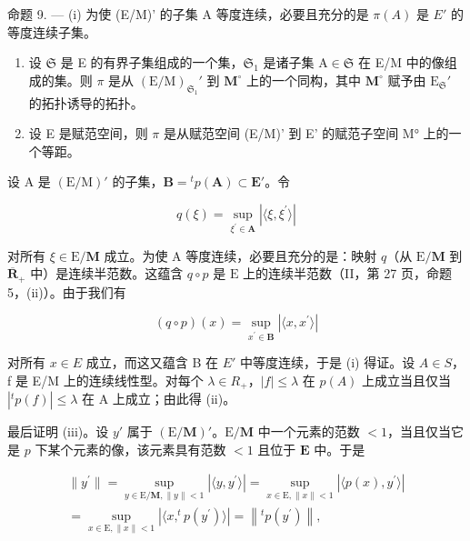 命题 9. --- (i) 为使 (E/M)' 的子集 A 等度连续，必要且充分的是 \(\pi(A)\) 是 \(E'\) 的等度连续子集。

\begin{enumerate}
\def\labelenumi{(\roman{enumi})}
\setcounter{enumi}{1}
\item
  设 \(\mathfrak{S}\) 是 E 的有界子集组成的一个集，\(\mathfrak{S}_1\) 是诸子集 \(\mathrm{A} \in \mathfrak{S}\) 在 E/M 中的像组成的集。则 \(\pi\) 是从 \((\mathrm{E} / \mathrm{M})_{\mathfrak{S}_1}'\) 到 \(\mathbf{M}^\circ\) 上的一个同构，其中 \(\mathbf{M}^\circ\) 赋予由 \(\mathrm{E}_{\mathfrak{S}}'\) 的拓扑诱导的拓扑。
\item
  设 E 是赋范空间，则 \(\pi\) 是从赋范空间 (E/M)' 到 E' 的赋范子空间 M° 上的一个等距。
\end{enumerate}

设 A 是 \((\mathrm{E}/\mathrm{M})'\) 的子集，\(\mathbf{B} = {}^{t}p(\mathbf{A}) \subset \mathbf{E}'\)。令

\[
q (\xi) = \sup _ {\xi^ {\prime} \in \mathbf {A}} | \langle \xi , \xi^ {\prime} \rangle |
\]

对所有 \(\xi \in \mathrm{E} / \mathbf{M}\) 成立。为使 A 等度连续，必要且充分的是：映射 \(q\)（从 \(\mathrm{E} / \mathbf{M}\) 到 \(\overline{\mathbf{R}}_+\) 中）是连续半范数。这蕴含 \(q \circ p\) 是 \(\mathrm{E}\) 上的连续半范数（II，第 27 页，命题 5，(ii)）。由于我们有

\[
(q \circ p) (x) = \sup _ {x ^ {\prime} \in \mathbf {B}} | \langle x, x ^ {\prime} \rangle |
\]

对所有 \(x \in E\) 成立，而这又蕴含 B 在 \(E'\) 中等度连续，于是 (i) 得证。设 \(A \in S\)，f 是 E/M 上的连续线性型。对每个 \(\lambda \in R_{+}\)，\(|f| \leqslant \lambda\) 在 \(p(A)\) 上成立当且仅当 \(|^{t}p(f)| \leqslant \lambda\) 在 A 上成立；由此得 (ii)。

最后证明 (iii)。设 \(y'\) 属于 \((\mathrm{E} / \mathbf{M})'\)。\(\mathrm{E} / \mathbf{M}\) 中一个元素的范数 \(< 1\)，当且仅当它是 \(p\) 下某个元素的像，该元素具有范数 \(< 1\) 且位于 \(\mathbf{E}\) 中。于是

\[
\begin{array}{l} \| y ^ {\prime} \| = \sup _ {y \in \mathrm{E} / \mathbf {M}, \| y \| <   1} \left| \langle y, y ^ {\prime} \rangle \right| = \sup _ {x \in \mathrm{E}, \| x \| <   1} \left| \langle p (x), y ^ {\prime} \rangle \right| \\ = \sup _ {x \in \mathrm{E}, \| x \| <   1} \left| \langle x, ^ {t} p (y ^ {\prime}) \rangle \right| = \left\| ^ {t} p (y ^ {\prime}) \right\|, \end{array}
\]

